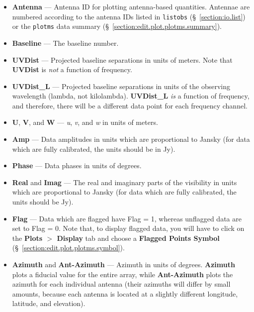 \begin{itemize}
\item {\bf Antenna} --- Antenna ID for plotting antenna-based quantities. Antennae are numbered according to the antenna IDs listed in {\tt listobs} (\S~\ref{section:io.list}) or the {\tt plotms} data summary (\S~\ref{section:edit.plot.plotms.summary}).

\item {\bf  Baseline} --- The baseline number.

\item {\bf UVDist} --- Projected baseline separations in units of meters. Note that {\bf UVDist} is {\it not} a function of frequency.

\item {\bf UVDist\_L} --- Projected baseline separations in units of the observing wavelength (lambda, not kilolambda). {\bf UVDist\_L} {\it is} a function of frequency, and therefore, there will be a different data point for each frequency channel.

\item {\bf U}, {\bf V}, and {\bf W} --- {\it u}, {\it v}, and {\it w} in units of meters.

\item {\bf Amp} --- Data amplitudes in units which are proportional to Jansky (for data which are fully calibrated, the units should be in Jy).

\item {\bf Phase} --- Data phases in units of degrees.

\item {\bf Real} and {\bf Imag} --- The real and imaginary parts of the visibility in units which are proportional to Jansky (for data which are fully calibrated, the units should be Jy).

\item {\bf Flag} --- Data which are flagged have Flag = 1, whereas unflagged data are set to Flag = 0. Note that, to display flagged data, you will have to click on the {\bf Plots $>$ Display} tab and choose a {\bf Flagged Points Symbol} (\S~\ref{section:edit.plot.plotms.symbol}).

\item {\bf Azimuth} and {\bf Ant-Azimuth} --- Azimuth in units of degrees. {\bf Azimuth} plots a fiducial value for the entire array, while {\bf Ant-Azimuth} plots the azimuth for each individual antenna (their azimuths will differ by small amounts, because each antenna is located at a slightly different longitude, latitude, and elevation).


\end{itemize}
